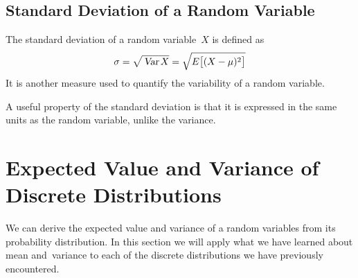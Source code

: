 \subsection{Standard Deviation of a Random Variable}
The standard deviation of a random variable~$X$ is defined as
\[
    \sigma = \sqrt{\mathstrut\operatorname{\textsl{Var}} X} 
    = \sqrt{\mathstrut E\bigl[(X - \mu)^2\bigr]}
\]
It is another measure used to quantify the variability of a random variable.
\begin{info}
A useful property of the standard deviation is that it is expressed in the same units as the random variable, unlike the variance.
\end{info}

\section{Expected Value and Variance of Discrete Distributions}
We can derive the expected value and variance of a random variables from its probability distribution. In this section we will apply what we have learned about mean and~variance to each of the discrete distributions we have previously encountered.
